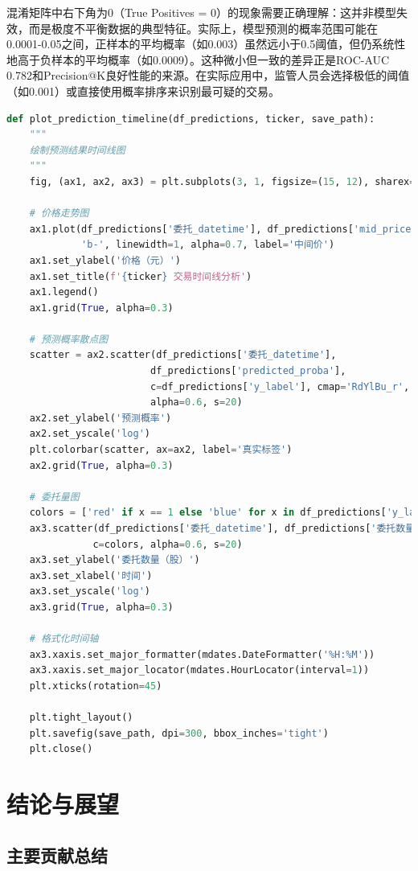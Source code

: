 \documentclass[12pt,a4paper]{article}
\begin{document}
混淆矩阵中右下角为0（True Positives = 0）的现象需要正确理解：这并非模型失效，而是极度不平衡数据的典型特征。实际上，模型预测的概率范围可能在0.0001-0.05之间，正样本的平均概率（如0.003）虽然远小于0.5阈值，但仍系统性地高于负样本的平均概率（如0.0009）。这种微小但一致的差异正是ROC-AUC 0.782和Precision@K良好性能的来源。在实际应用中，监管人员会选择极低的阈值（如0.001）或直接使用概率排序来识别最可疑的交易。

\begin{lstlisting}[language=Python, caption=预测结果可视化]
def plot_prediction_timeline(df_predictions, ticker, save_path):
    """
    绘制预测结果时间线图
    """
    fig, (ax1, ax2, ax3) = plt.subplots(3, 1, figsize=(15, 12), sharex=True)
    
    # 价格走势图
    ax1.plot(df_predictions['委托_datetime'], df_predictions['mid_price'], 
             'b-', linewidth=1, alpha=0.7, label='中间价')
    ax1.set_ylabel('价格（元）')
    ax1.set_title(f'{ticker} 交易时间线分析')
    ax1.legend()
    ax1.grid(True, alpha=0.3)
    
    # 预测概率散点图
    scatter = ax2.scatter(df_predictions['委托_datetime'], 
                         df_predictions['predicted_proba'],
                         c=df_predictions['y_label'], cmap='RdYlBu_r',
                         alpha=0.6, s=20)
    ax2.set_ylabel('预测概率')
    ax2.set_yscale('log')
    plt.colorbar(scatter, ax=ax2, label='真实标签')
    ax2.grid(True, alpha=0.3)
    
    # 委托量图
    colors = ['red' if x == 1 else 'blue' for x in df_predictions['y_label']]
    ax3.scatter(df_predictions['委托_datetime'], df_predictions['委托数量'],
               c=colors, alpha=0.6, s=20)
    ax3.set_ylabel('委托数量（股）')
    ax3.set_xlabel('时间')
    ax3.set_yscale('log')
    ax3.grid(True, alpha=0.3)
    
    # 格式化时间轴
    ax3.xaxis.set_major_formatter(mdates.DateFormatter('%H:%M'))
    ax3.xaxis.set_major_locator(mdates.HourLocator(interval=1))
    plt.xticks(rotation=45)
    
    plt.tight_layout()
    plt.savefig(save_path, dpi=300, bbox_inches='tight')
    plt.close()
\end{lstlisting}

\section{结论与展望}

\subsection{主要贡献总结}
\end{document}
